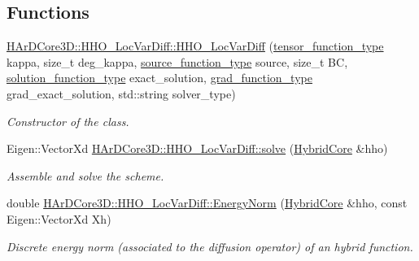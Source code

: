 \subsection*{Functions}
\begin{DoxyCompactItemize}
\item 
\hyperlink{group__HHO__LocVarDiff_ga498c8ed6193d76926ca3f3627ed6cf11}{H\+Ar\+D\+Core3\+D\+::\+H\+H\+O\+\_\+\+Loc\+Var\+Diff\+::\+H\+H\+O\+\_\+\+Loc\+Var\+Diff} (\hyperlink{classHArDCore3D_1_1HHO__LocVarDiff_aba48f23cd9e46ab3b0d7d907e0990bd6}{tensor\+\_\+function\+\_\+type} kappa, size\+\_\+t deg\+\_\+kappa, \hyperlink{classHArDCore3D_1_1HHO__LocVarDiff_a478a09a65f66428a614412e7d308ffcd}{source\+\_\+function\+\_\+type} source, size\+\_\+t BC, \hyperlink{classHArDCore3D_1_1HHO__LocVarDiff_a57cf83c67a9bcd71822a4ebdfbe0f0ce}{solution\+\_\+function\+\_\+type} exact\+\_\+solution, \hyperlink{classHArDCore3D_1_1HHO__LocVarDiff_a13003c1e92aab2a21e3055e2fd7104f8}{grad\+\_\+function\+\_\+type} grad\+\_\+exact\+\_\+solution, std\+::string solver\+\_\+type)
\begin{DoxyCompactList}\small\item\em Constructor of the class. \end{DoxyCompactList}\item 
\mbox{\label{group__HHO__LocVarDiff_gab01c6aad8ad6264f67f866ec26c8055d}} 
Eigen\+::\+Vector\+Xd \hyperlink{group__HHO__LocVarDiff_gab01c6aad8ad6264f67f866ec26c8055d}{H\+Ar\+D\+Core3\+D\+::\+H\+H\+O\+\_\+\+Loc\+Var\+Diff\+::solve} (\hyperlink{classHArDCore3D_1_1HybridCore}{Hybrid\+Core} \&hho)
\begin{DoxyCompactList}\small\item\em Assemble and solve the scheme. \end{DoxyCompactList}\item 
\mbox{\label{group__HHO__LocVarDiff_gab04749bad041c0ed9e91c54f262d42e1}} 
double \hyperlink{group__HHO__LocVarDiff_gab04749bad041c0ed9e91c54f262d42e1}{H\+Ar\+D\+Core3\+D\+::\+H\+H\+O\+\_\+\+Loc\+Var\+Diff\+::\+Energy\+Norm} (\hyperlink{classHArDCore3D_1_1HybridCore}{Hybrid\+Core} \&hho, const Eigen\+::\+Vector\+Xd Xh)
\begin{DoxyCompactList}\small\item\em Discrete energy norm (associated to the diffusion operator) of an hybrid function. \end{DoxyCompactList}\item 

\end{DoxyCompactItemize}
